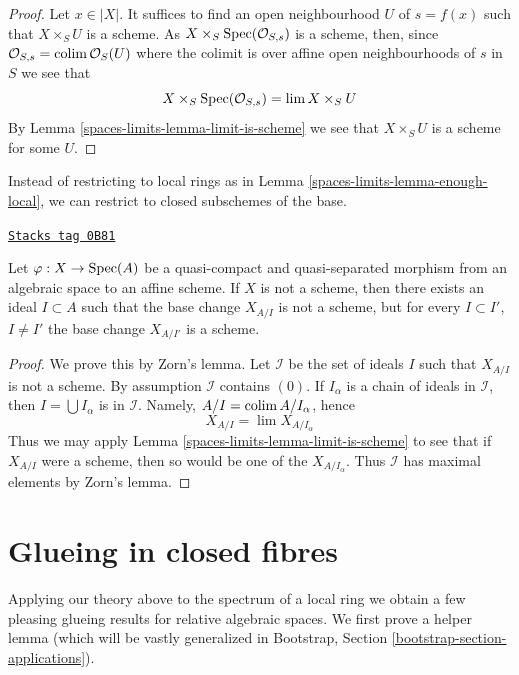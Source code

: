 \begin{proof}
Let $x \in |X|$. It suffices to find an open neighbourhood $U$ of
$s = f(x)$ such that $X \times_S U$ is a scheme.
As $X \times_S \operatorname{Spec}(\mathcal{O}_{S, s})$ is a scheme, then, since
$\mathcal{O}_{S, s} = \operatorname{colim} \mathcal{O}_S(U)$ where the colimit is
over affine open neighbourhoods of $s$ in $S$ we see that
$$
X \times_S \operatorname{Spec}(\mathcal{O}_{S, s}) = \lim X \times_S U
$$
By Lemma \ref{spaces-limits-lemma-limit-is-scheme} we see that $X \times_S U$
is a scheme for some $U$.
\end{proof}

Instead of restricting to local rings as in Lemma \ref{spaces-limits-lemma-enough-local},
we can restrict to closed subschemes of the base.

\begin{lemma}
\label{spaces-limits-lemma-maximal-ideal}
\href{https://stacks.math.columbia.edu/tag/0B81}{\texttt{Stacks tag 0B81}}

Let $\varphi : X \to \operatorname{Spec}(A)$ be a quasi-compact and quasi-separated
morphism from an algebraic space to an affine scheme.
If $X$ is not a scheme, then there exists an ideal $I \subset A$
such that the base change $X_{A/I}$ is not a scheme, but
for every $I \subset I'$, $I \not = I'$ the base change
$X_{A/I'}$ is a scheme.
\end{lemma}

\begin{proof}
We prove this by Zorn's lemma. Let $\mathcal{I}$ be the set
of ideals $I$ such that $X_{A/I}$ is not a scheme. By
assumption $\mathcal{I}$ contains $(0)$. If $I_\alpha$ is
a chain of ideals in $\mathcal{I}$, then
$I = \bigcup I_\alpha$ is in $\mathcal{I}$. Namely,
$A/I = \operatorname{colim} A/I_\alpha$, hence
$$
X_{A/I} = \lim X_{A/I_\alpha}
$$
Thus we may apply Lemma \ref{spaces-limits-lemma-limit-is-scheme} to see that if $X_{A/I}$
were a scheme, then so would be one of the $X_{A/I_\alpha}$.
Thus $\mathcal{I}$ has maximal elements by Zorn's lemma.
\end{proof}

\section{Glueing in closed fibres}
\label{spaces-limits-section-change-over-closed-points}
Applying our theory above to the spectrum of a local ring we obtain
a few pleasing glueing results for relative algebraic spaces.
We first prove a helper lemma (which will be vastly generalized
in Bootstrap, Section \ref{bootstrap-section-applications}).

